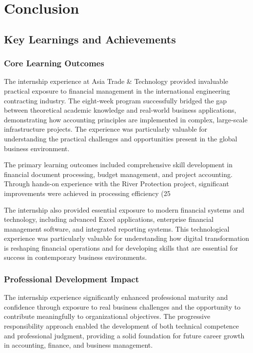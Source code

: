 
\chapter{Conclusion}

\section{Key Learnings and Achievements}

\subsection{Core Learning Outcomes}
The internship experience at Asia Trade \& Technology provided invaluable practical exposure to financial management in the international engineering contracting industry. The eight-week program successfully bridged the gap between theoretical academic knowledge and real-world business applications, demonstrating how accounting principles are implemented in complex, large-scale infrastructure projects. The experience was particularly valuable for understanding the practical challenges and opportunities present in the global business environment.

The primary learning outcomes included comprehensive skill development in financial document processing, budget management, and project accounting. Through hands-on experience with the River Protection project, significant improvements were achieved in processing efficiency (25%

The internship also provided essential exposure to modern financial systems and technology, including advanced Excel applications, enterprise financial management software, and integrated reporting systems. This technological experience was particularly valuable for understanding how digital transformation is reshaping financial operations and for developing skills that are essential for success in contemporary business environments.

\subsection{Professional Development Impact}
The internship experience significantly enhanced professional maturity and confidence through exposure to real business challenges and the opportunity to contribute meaningfully to organizational objectives. The progressive responsibility approach enabled the development of both technical competence and professional judgment, providing a solid foundation for future career growth in accounting, finance, and business management.

